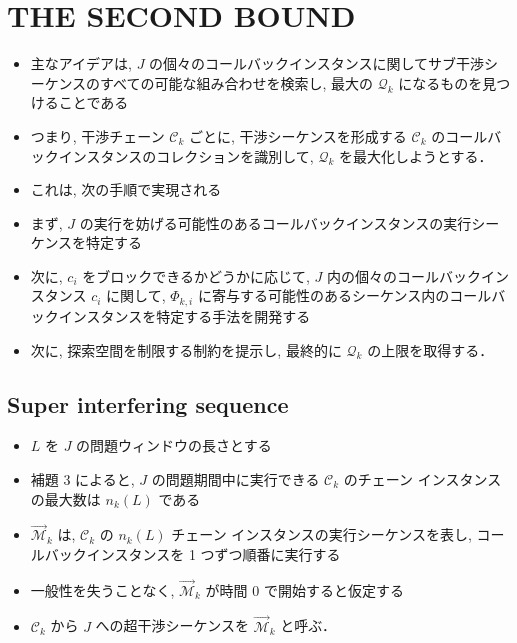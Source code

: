 
\section{THE SECOND BOUND}
\label{sec: the_second_bound}

\begin{frame}{}
    \begin{itemize}
        \item 主なアイデアは, $J$ の個々のコールバックインスタンスに関してサブ干渉シーケンスのすべての可能な組み合わせを検索し, 最大の $\mathcal{Q}_{k}$ になるものを見つけることである
        \item つまり, 干渉チェーン $\mathcal{C}_{k}$ ごとに, 干渉シーケンスを形成する $\mathcal{C}_{k}$ のコールバックインスタンスのコレクションを識別して, $\mathcal{Q}_{k}$ を最大化しようとする．
    \end{itemize}
\end{frame}

\begin{frame}{}
    \begin{itemize}
        \item これは, 次の手順で実現される
        \item まず,  $J$ の実行を妨げる可能性のあるコールバックインスタンスの実行シーケンスを特定する
        \item 次に, $c_{i}$ をブロックできるかどうかに応じて, $J$ 内の個々のコールバックインスタンス $c_{i}$ に関して, $\Phi_{k, i}$ に寄与する可能性のあるシーケンス内のコールバックインスタンスを特定する手法を開発する
        \item 次に, 探索空間を制限する制約を提示し, 最終的に $\mathcal{Q}_{k}$ の上限を取得する．
    \end{itemize}
\end{frame}

\subsection{Super interfering sequence}
\label{ssec: super_interfering_sequence}

\begin{frame}{}
    \begin{itemize}
        \item $L$ を $J$ の問題ウィンドウの長さとする
        \item 補題 3 によると,  $J$ の問題期間中に実行できる $\mathcal{C}_{k}$ のチェーン インスタンスの最大数は $n_{k}(L)$ である
        \item $\overrightarrow{\mathcal{M}}_{k}$ は, $\mathcal{C}_{k}$ の $n_{k}(L)$ チェーン インスタンスの実行シーケンスを表し, コールバックインスタンスを 1 つずつ順番に実行する
        \item 一般性を失うことなく,  $\overrightarrow{\mathcal{M}}_{k}$ が時間 0 で開始すると仮定する
        \item $\mathcal{C}_{k}$ から $J$ への超干渉シーケンスを $\overrightarrow{\mathcal{M}}_{k}$ と呼ぶ．
    \end{itemize}
\end{frame}

